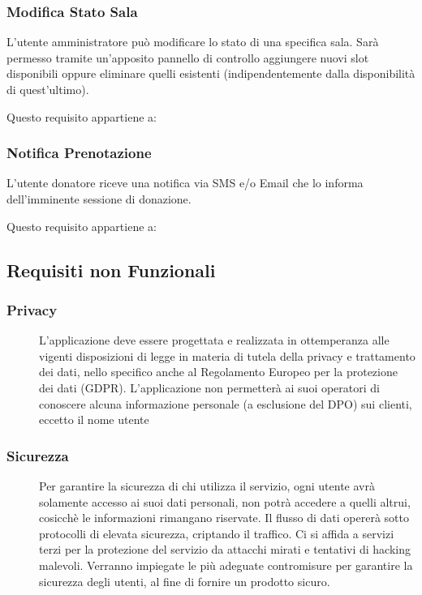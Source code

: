 \documentclass{article}
\newcommand*\circled[1]{\tikz[baseline=(char.base)]{
            \node[shape=circle,draw,inner sep=2pt] (char) {#1};}}
\begin{document}
\subsubsection{Modifica Stato Sala} \label{rf_10}
\begin{description}
    \item[] L'utente amministratore può modificare lo stato di una specifica sala. Sarà permesso tramite un’apposito pannello di controllo aggiungere nuovi slot
disponibili oppure eliminare quelli esistenti (indipendentemente dalla disponibilità di quest’ultimo).
    \item Questo requisito appartiene a: \circled{Ad}
\end{description}

\subsubsection{Notifica Prenotazione} \label{rf_11}
\begin{description}
    \item[] L'utente donatore riceve una notifica via SMS e/o Email che lo informa dell'imminente sessione di donazione.
    \item Questo requisito appartiene a: \circled{Re}
\end{description}

\clearpage
\subsection{Requisiti non Funzionali}
\renewcommand\thesubsubsection{RNF\arabic{subsubsection}}
\subsubsection{Privacy} \label{rnf_1}
\begin{description}
    \item[] L’applicazione deve essere progettata e realizzata in ottemperanza alle vigenti disposizioni di legge in materia di
tutela della privacy e trattamento dei dati, nello specifico anche al Regolamento Europeo per la protezione
dei dati (GDPR).
L’applicazione non permetterà ai suoi operatori di conoscere alcuna informazione personale (a esclusione del
DPO) sui clienti, eccetto il nome utente
\end{description}

\subsubsection{Sicurezza} \label{rnf_2}
\begin{description}
    \item[] Per garantire la sicurezza di chi utilizza il servizio, ogni utente avrà solamente accesso ai suoi dati personali, non potrà accedere a quelli altrui, cosicchè le informazioni rimangano riservate.
 Il flusso di dati opererà sotto protocolli di elevata sicurezza, criptando il traffico.
Ci si affida a servizi terzi per la protezione del servizio da attacchi mirati e tentativi di hacking malevoli.
Verranno impiegate le più adeguate contromisure per garantire la sicurezza degli utenti, al fine di fornire un prodotto sicuro.
\end{description}
\end{document}
